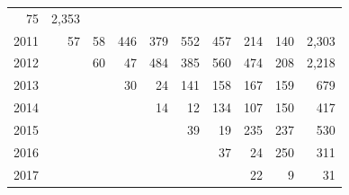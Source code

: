 \begin{table}[!h]
\begin{tabular}{llllllllll}
  \multicolumn{1}{r}{75} &
  \multicolumn{1}{r}{2,353} \\
\multicolumn{1}{l}{\hspace{1em}2011} &
  \multicolumn{1}{|r}{57} &
  \multicolumn{1}{r}{58} &
  \multicolumn{1}{r}{446} &
  \multicolumn{1}{r}{379} &
  \multicolumn{1}{r}{552} &
  \multicolumn{1}{r}{457} &
  \multicolumn{1}{r}{214} &
  \multicolumn{1}{r}{140} &
  \multicolumn{1}{r}{2,303} \\
\multicolumn{1}{l}{\hspace{1em}2012} &
  \multicolumn{1}{|r}{} &
  \multicolumn{1}{r}{60} &
  \multicolumn{1}{r}{47} &
  \multicolumn{1}{r}{484} &
  \multicolumn{1}{r}{385} &
  \multicolumn{1}{r}{560} &
  \multicolumn{1}{r}{474} &
  \multicolumn{1}{r}{208} &
  \multicolumn{1}{r}{2,218} \\
\multicolumn{1}{l}{\hspace{1em}2013} &
  \multicolumn{1}{|r}{} &
  \multicolumn{1}{r}{} &
  \multicolumn{1}{r}{30} &
  \multicolumn{1}{r}{24} &
  \multicolumn{1}{r}{141} &
  \multicolumn{1}{r}{158} &
  \multicolumn{1}{r}{167} &
  \multicolumn{1}{r}{159} &
  \multicolumn{1}{r}{679} \\
\multicolumn{1}{l}{\hspace{1em}2014} &
  \multicolumn{1}{|r}{} &
  \multicolumn{1}{r}{} &
  \multicolumn{1}{r}{} &
  \multicolumn{1}{r}{14} &
  \multicolumn{1}{r}{12} &
  \multicolumn{1}{r}{134} &
  \multicolumn{1}{r}{107} &
  \multicolumn{1}{r}{150} &
  \multicolumn{1}{r}{417} \\
\multicolumn{1}{l}{\hspace{1em}2015} &
  \multicolumn{1}{|r}{} &
  \multicolumn{1}{r}{} &
  \multicolumn{1}{r}{} &
  \multicolumn{1}{r}{} &
  \multicolumn{1}{r}{39} &
  \multicolumn{1}{r}{19} &
  \multicolumn{1}{r}{235} &
  \multicolumn{1}{r}{237} &
  \multicolumn{1}{r}{530} \\
\multicolumn{1}{l}{\hspace{1em}2016} &
  \multicolumn{1}{|r}{} &
  \multicolumn{1}{r}{} &
  \multicolumn{1}{r}{} &
  \multicolumn{1}{r}{} &
  \multicolumn{1}{r}{} &
  \multicolumn{1}{r}{37} &
  \multicolumn{1}{r}{24} &
  \multicolumn{1}{r}{250} &
  \multicolumn{1}{r}{311} \\
\multicolumn{1}{l}{\hspace{1em}2017} &
  \multicolumn{1}{|r}{} &
  \multicolumn{1}{r}{} &
  \multicolumn{1}{r}{} &
  \multicolumn{1}{r}{} &
  \multicolumn{1}{r}{} &
  \multicolumn{1}{r}{} &
  \multicolumn{1}{r}{22} &
  \multicolumn{1}{r}{9} &
  \multicolumn{1}{r}{31} \\

\end{tabular}
\end{table}
